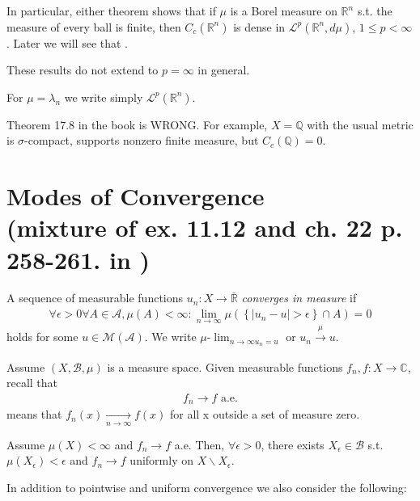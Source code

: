 In particular, either theorem shows that if \(\mu\) is a Borel measure on \(\mathbb{R}^n\) s.t. the measure of every ball is finite, then 
\(C_c(\mathbb{R}^n)\) is dense in \(\mathcal{L}^p(\mathbb{R}^n, d\mu)\), \(1\leq p< \infty\). Later we will see that .
\begin{remark}
    These results do not extend to \(p=\infty\) in general. 

    For \(\mu=\lambda_n\) we write simply \(\mathcal{L}^p(\mathbb{R}^n)\).
\end{remark}
\begin{remark}
    Theorem 17.8 in the book is WRONG. For example, \(X=\mathbb{Q}\) with the usual metric is \(\sigma\)-compact, supports nonzero finite measure,
    but \(C_c(\mathbb{Q})=0\).
\end{remark}

\section*{Modes of Convergence \protect\\ \tiny{(mixture of ex. 11.12 and ch. 22 p. 258-261. in \cite{schilling2017measures})}}
\ifdetailed
\begin{definition}
    A sequence of measurable functions \(u_n:X\rightarrow \bar{\mathbb{R}}\) \emph{converges in measure} if
    \begin{align*}
        \forall\epsilon>0\forall A\in\mathscr{A},\mu(A)<\infty:\lim\limits_{n\rightarrow\infty} 
        \mu\left(\left\{\vert u_n - u\vert > \epsilon\right\}\cap A\right) = 0
    \end{align*}
    holds for some \(u\in\mathcal{M}(\mathscr{A})\). We write \(\mu\)-\(\lim_{n\rightarrow\infty u_n = u}\) or 
    \(u_n\xrightarrow[ ]{\mu} u\).
\end{definition}
\fi
Assume \(\left(X,\mathscr{B},\mu\right)\) is a measure space. Given measurable functions \(f_n,f:X\rightarrow\mathbb{C}\), recall that
\begin{align*}
    f_n\rightarrow f \text{ a.e.}
\end{align*}
means that \(f_n(x)\xrightarrow[n\rightarrow\infty]{ } f(x)\) for all x outside a set of measure zero. 
\begin{theorem}
    Assume \(\mu(X)<\infty\) and \(f_n\rightarrow f\) a.e. Then, \(\forall\epsilon>0\), there exists \(X_{\epsilon} \in\mathscr{B}\)
    s.t. \(\mu(X_{\epsilon})<\epsilon\) and \(f_n\rightarrow f\) uniformly on \(X\backslash X_{\epsilon}\).
\end{theorem}
In addition to pointwise and uniform convergence we also consider the following: 

